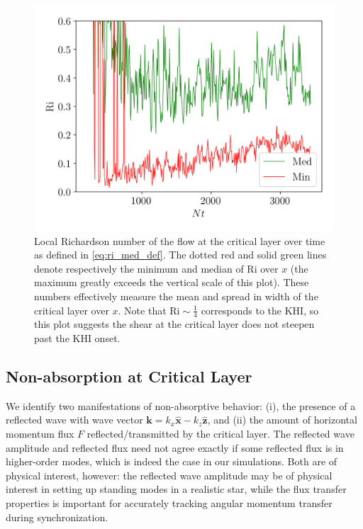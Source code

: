 \documentclass[
        fleqn,
        usenatbib,
    ]{mnras}
\newcommand*{\bm}[1]{\mathbf{#1}}
\newcommand*{\uv}[1]{\hat{\mathbf{#1}}}
\begin{document}
\begin{figure}
    \centering
    \includegraphics[width=\columnwidth]{plots/nl_f_ri.png}
    \caption{Local Richardson number of the flow at the critical layer over time
    as defined in \autoref{eq:ri_med_def}. The dotted red and solid green lines
    denote respectively the minimum and median of $\mathrm{Ri}$ over $x$ (the
    maximum greatly exceeds the vertical scale of this plot). These numbers
    effectively measure the mean and spread in width of the critical layer over
    $x$. Note that $\mathrm{Ri} \sim \frac{1}{4}$ corresponds to the KHI, so
    this plot suggests the shear at the critical layer does not steepen past the
    KHI onset.}\label{fig:nl_f_ri}
\end{figure}

\subsection{Non-absorption at Critical Layer}\label{ss:reflectivity}

We identify two manifestations of non-absorptive behavior: (i), the presence of
a reflected wave with wave vector $\bm{k} = k_{x}\uv{x} - k_{z}\uv{z}$, and (ii)
the amount of horizontal momentum flux $F$ reflected/transmitted by the critical
layer. The reflected wave amplitude and reflected flux need not agree exactly if
some reflected flux is in higher-order modes, which is indeed the case in our
simulations. Both are of physical interest, however: the reflected wave
amplitude may be of physical interest in setting up standing modes in a
realistic star, while the flux transfer properties is important for accurately
tracking angular momentum transfer during synchronization.
\end{document}
